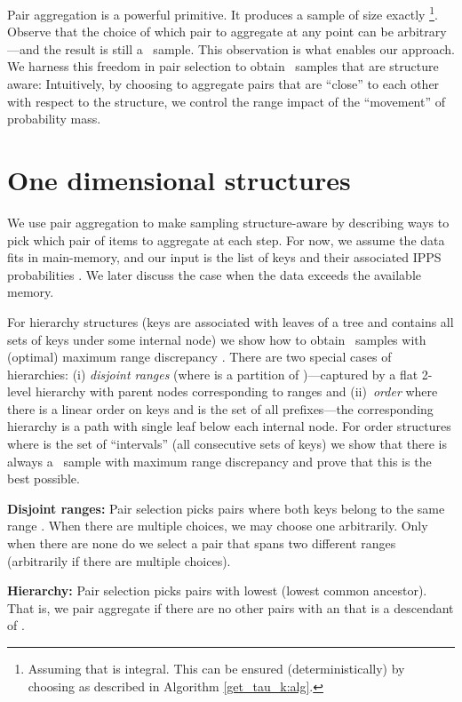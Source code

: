 \documentclass[11pt]{article}
\begin{document}
Pair aggregation is a powerful primitive.
It produces a sample of size exactly  
\footnote{Assuming that 
  is integral.  
This can be ensured (deterministically) by choosing  as
described in Algorithm \ref{get_tau_k:alg}.}.
Observe that the choice of which pair  to aggregate at any point
can be arbitrary---and the result is still a \varopt\ sample.  
This observation is what enables our approach.   
We harness this freedom in pair selection
to obtain \varopt\ samples that are structure
aware:  
Intuitively, by choosing to aggregate pairs that are
 ``close'' to each other with respect to the structure, 
we control the range impact of the ``movement'' of probability mass.

\section{One dimensional structures} \label{onedim:sec}

We use pair aggregation to make sampling structure-aware by describing
ways to pick which pair of items to aggregate at each step. 
For now, we assume  the data fits in main-memory, 
and our input is the list of keys and their associated IPPS
probabilities .
We later
discuss the case when the data exceeds the available memory.


For hierarchy structures
 (keys  are associated with leaves of a tree and  contains
all sets of keys under some internal node) we show how to obtain
\varopt\ samples with (optimal) maximum range discrepancy .
There are two special cases of hierarchies:
   (i) {\em disjoint ranges} (where
   is a partition of )---captured by a flat 2-level 
hierarchy with parent nodes corresponding to ranges and
(ii)~{\em order} where there is a linear order on keys and 
 is the set of all prefixes---the corresponding 
hierarchy is a path with single leaf below each internal node.
For order structures  where  is the
set of ``intervals'' (all consecutive sets of keys) we show that there
is always a \varopt\ sample with maximum range discrepancy  and
prove that this is the best possible.


\label{drandhierarchy:sec}
\begin{list}{}{\leftmargin=1em}
\item
{\bf Disjoint ranges:}
Pair selection picks pairs where both keys belong to the same range .  
When there are multiple choices, we may choose one arbitrarily.
Only when there are none do we
select a pair 
that spans two different ranges (arbitrarily if there are multiple
choices).


\item 
{\bf Hierarchy:}
   Pair selection picks pairs with lowest  (lowest common ancestor).  
That is, we pair aggregate  if there are no other pairs
with an  that is a descendant of .  
\end{list}
\end{document}
